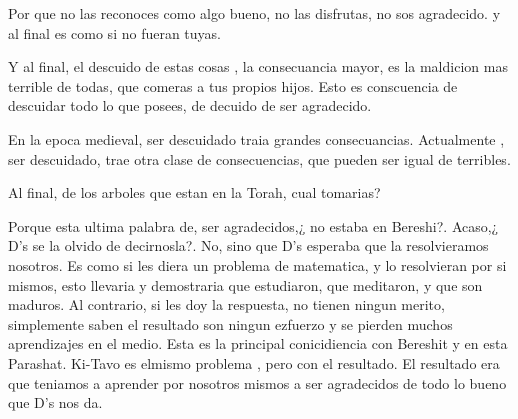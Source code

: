 \documentclass[conference]{IEEEtran}
\begin{document}
Por que no las reconoces como algo bueno, no las disfrutas, no sos agradecido. y al final es como si no fueran tuyas.

 Y al final, el descuido de estas cosas , la consecuancia mayor, es la maldicion mas terrible de todas, que comeras a tus propios hijos. Esto es conscuencia de descuidar todo lo que posees, de decuido de ser agradecido. 
 
 En la epoca medieval, ser descuidado traia grandes consecuancias. Actualmente , ser descuidado, trae otra clase de consecuencias, que pueden ser igual de terribles.



Al final, de los arboles que estan en la Torah, cual tomarias?

Porque esta ultima palabra de, ser agradecidos,¿ no estaba en Bereshi?. Acaso,¿ D's se la olvido de decirnosla?.
No, sino que D's esperaba que la resolvieramos nosotros. Es como si les diera un problema de matematica, y lo resolvieran por si mismos, esto llevaria y demostraria que estudiaron, que meditaron, y que son maduros. Al contrario, si les doy la respuesta, no tienen ningun merito, simplemente saben el resultado son ningun ezfuerzo y se pierden muchos aprendizajes en el medio.
Esta es la principal conicidiencia con Bereshit y en esta Parashat. Ki-Tavo es elmismo problema , pero con el resultado. 
El resultado era que teniamos a aprender por nosotros mismos a ser agradecidos de todo lo bueno que D's nos da.






\end{document}
